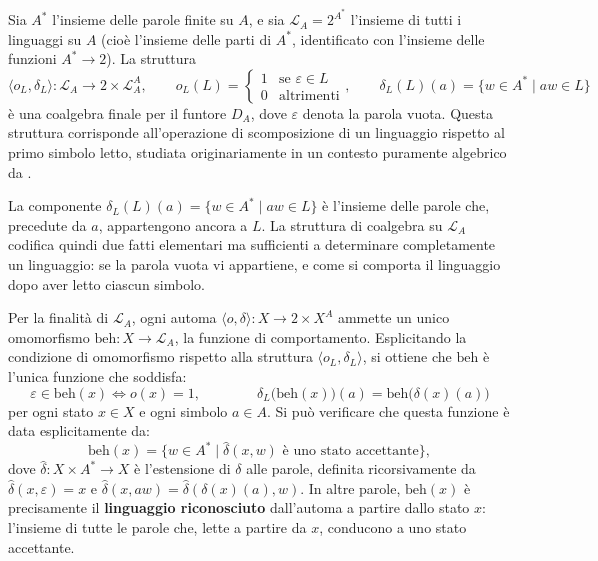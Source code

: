 \begin{proposition}
  Sia \(A^*\) l'insieme delle parole finite su \(A\), e sia \(\mathcal{L}_A = 2^{A^*}\) l'insieme di tutti i linguaggi su \(A\) (cioè l'insieme delle parti di \(A^*\), identificato con l'insieme delle funzioni \(A^* \to 2\)). La struttura
  \[
    \langle o_L, \delta_L \rangle : \mathcal{L}_A \to 2 \times \mathcal{L}_A^A, \qquad
    o_L(L) = \begin{cases} 1 & \text{se } \varepsilon \in L \\ 0 & \text{altrimenti} \end{cases}, \qquad
    \delta_L(L)(a) = \{w \in A^* \mid aw \in L\}
  \]
  è una coalgebra finale per il funtore \(D_A\), dove \(\varepsilon\) denota la parola vuota. Questa struttura corrisponde all'operazione di scomposizione di un linguaggio rispetto al primo simbolo letto, studiata originariamente in un contesto puramente algebrico da \cite{brzozowski1964}.
\end{proposition}

La componente \(\delta_L(L)(a) = \{w \in A^* \mid aw \in L\}\) è l'insieme delle parole che, precedute da \(a\), appartengono ancora a \(L\). La struttura di coalgebra su \(\mathcal{L}_A\) codifica quindi due fatti elementari ma sufficienti a determinare completamente un linguaggio: se la parola vuota vi appartiene, e come si comporta il linguaggio dopo aver letto ciascun simbolo.

Per la finalità di \(\mathcal{L}_A\), ogni automa \(\langle o, \delta \rangle : X \to 2 \times X^A\) ammette un unico omomorfismo \(\mathrm{beh} : X \to \mathcal{L}_A\), la funzione di comportamento. Esplicitando la condizione di omomorfismo rispetto alla struttura \(\langle o_L, \delta_L \rangle\), si ottiene che \(\mathrm{beh}\) è l'unica funzione che soddisfa:
\[
  \varepsilon \in \mathrm{beh}(x) \iff o(x) = 1, \qquad\qquad \delta_L\bigl(\mathrm{beh}(x)\bigr)(a) = \mathrm{beh}\bigl(\delta(x)(a)\bigr)
\]
per ogni stato \(x \in X\) e ogni simbolo \(a \in A\). Si può verificare che questa funzione è data esplicitamente da:
\[
  \mathrm{beh}(x) = \{w \in A^* \mid \hat{\delta}(x, w) \text{ è uno stato accettante}\},
\]
dove \(\hat{\delta} : X \times A^* \to X\) è l'estensione di \(\delta\) alle parole, definita ricorsivamente da \(\hat{\delta}(x, \varepsilon) = x\) e \(\hat{\delta}(x, aw) = \hat{\delta}(\delta(x)(a), w)\). In altre parole, \(\mathrm{beh}(x)\) è precisamente il \textbf{linguaggio riconosciuto} dall'automa a partire dallo stato \(x\): l'insieme di tutte le parole che, lette a partire da \(x\), conducono a uno stato accettante.


